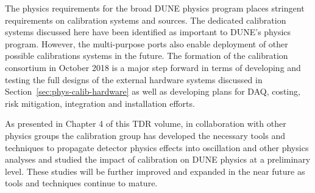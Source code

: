 The physics requirements for the broad DUNE physics program places stringent requirements on calibration systems and sources. The dedicated calibration systems discussed here have been identified as important to DUNE's physics program. However, the multi-purpose ports also enable deployment of other possible calibrations systems in the future. The formation of the calibration consortium in October 2018 is a major step forward in terms of developing and testing the full designs of the external hardware systems discussed in Section~\ref{sec:phys-calib-hardware} as well as developing plans for DAQ, costing, risk mitigation, integration and installation efforts. 

As presented in Chapter 4  of this TDR volume, in collaboration with other physics groups the calibration group has developed the necessary tools and techniques to propagate detector physics effects into oscillation and other physics analyses and studied the impact of calibration on DUNE physics at a preliminary level. %
These studies will be further improved and expanded in the near future as tools and techniques continue to mature. 


\begin{comment}
\begin{dunetable}[Key calibration milestones leading to first detector installation]{ll}{tab:TDRsteps}{Key calibration milestones leading to first detector installation.}
Date & \textbf{Milestone}\\ \toprowrule
May 2018 & \dword{tp} \\ \colhline
June 2018 & Finalize process of integrating calibration into consortium structure\\ \colhline
Jan. 2019 & Design validation of calibration systems using \dword{protodune}\slash SBN data  \\
&(where applicable) and incorporate lessons learned into designs \\ \colhline
Apr. 2019 & Technical design report \\ \colhline
Sep. 2022 & Finish construction of calibration systems for Cryostat \#1 \\ \colhline
May 2023 & Cryostat 1 ready for TPC installation \\ \colhline
Oct. 2023 & All calibration systems installed in Cryostat \#1 \\
\end{dunetable} 
\end{comment}


